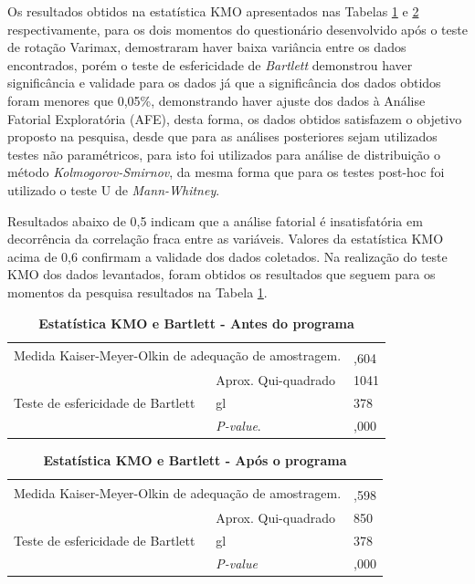 Os resultados obtidos na estatística KMO apresentados nas Tabelas \ref{tabela_8} e \ref{tabela_9} respectivamente, para os dois momentos do questionário desenvolvido após o teste de rotação Varimax,  demostraram haver baixa variância entre os dados encontrados, porém o teste de esfericidade de \textit{Bartlett} demonstrou haver significância e validade para os dados já que a significância dos dados obtidos foram menores que 0,05\%, demonstrando haver ajuste dos dados à Análise Fatorial Exploratória (AFE), desta forma, os dados obtidos satisfazem o objetivo proposto na pesquisa, desde que para as análises posteriores sejam utilizados testes não paramétricos, para isto foi utilizados para análise de distribuição o método \textit{Kolmogorov-Smirnov}, da mesma forma que para os testes post-hoc foi utilizado o teste U de \textit{Mann-Whitney}.


Resultados abaixo de 0,5 indicam que a análise fatorial é insatisfatória em decorrência da correlação fraca entre as variáveis. Valores da estatística KMO acima de 0,6 confirmam a validade dos dados coletados. Na realização do teste KMO dos dados levantados, foram obtidos os resultados que seguem para os momentos da pesquisa resultados na Tabela \ref{tabela_8}.

\begin{table}[H]
\FloatBarrier
\centering
\caption{\textbf{Estatística KMO e Bartlett - Antes do programa}}
\label{tabela_8}
\begin{tabular}{ll|l}
\hline\hline
\multicolumn{2}{l|}{\multirow{2}{*}{Medida Kaiser-Meyer-Olkin de adequação de amostragem.}} &  \\
\multicolumn{2}{l|}{} & ,604 \\ \hline
\multirow{3}{*}{Teste de esfericidade de Bartlett} & Aprox. Qui-quadrado & 1041 \\
 & gl & 378 \\
 & \textit{P-value}. & ,000 \\ \hline
\end{tabular}
\end{table}

\begin{table}[H]
\FloatBarrier
\centering
\caption{\textbf{Estatística KMO e Bartlett - Após o programa}}
\label{tabela_9}
\begin{tabular}{ll|l}
\hline\hline
\multicolumn{2}{l|}{\multirow{2}{*}{Medida Kaiser-Meyer-Olkin de adequação de amostragem.}} &  \\
\multicolumn{2}{l|}{} & ,598 \\ \hline
\multirow{3}{*}{Teste de esfericidade de Bartlett} & Aprox. Qui-quadrado & 850 \\
 & gl & 378 \\
 & \textit{P-value} & ,000 \\ \hline
\end{tabular}
\end{table}

